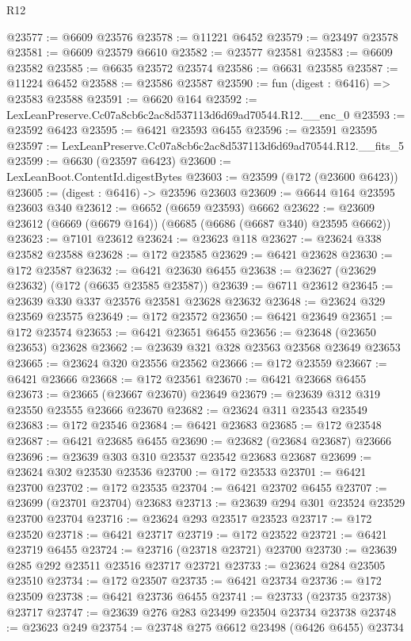 \begin{lexlean}{R12}
\begin{coremodule}
@23577 := @6609 @23576
@23578 := @11221 @6452
@23579 := @23497 @23578
@23581 := @6609 @23579 @6610
@23582 := @23577 @23581
@23583 := @6609 @23582
@23585 := @6635 @23572 @23574
@23586 := @6631 @23585
@23587 := @11224 @6452
@23588 := @23586 @23587
@23590 := fun (digest : @6416) => @23583 @23588
@23591 := @6620 @164
@23592 := LexLeanPreserve.Cc07a8cb6c2ac8d537113d6d69ad70544.R12.__enc_0
@23593 := @23592 @6423
@23595 := @6421 @23593 @6455
@23596 := @23591 @23595
@23597 := LexLeanPreserve.Cc07a8cb6c2ac8d537113d6d69ad70544.R12.__fits_5
@23599 := @6630 (@23597 @6423)
@23600 := LexLeanBoot.ContentId.digestBytes
@23603 := @23599 (@172 (@23600 @6423))
@23605 := (digest : @6416) -> @23596 @23603
@23609 := @6644 @164 @23595 @23603 @340
@23612 := @6652 (@6659 @23593) @6662
@23622 := @23609 @23612 (@6669 (@6679 @164)) (@6685 (@6686 (@6687 @340) @23595 @6662))
@23623 := @7101 @23612
@23624 := @23623 @118
@23627 := @23624 @338 @23582 @23588
@23628 := @172 @23585
@23629 := @6421 @23628
@23630 := @172 @23587
@23632 := @6421 @23630 @6455
@23638 := @23627 (@23629 @23632) (@172 (@6635 @23585 @23587))
@23639 := @6711 @23612
@23645 := @23639 @330 @337 @23576 @23581 @23628 @23632
@23648 := @23624 @329 @23569 @23575
@23649 := @172 @23572
@23650 := @6421 @23649
@23651 := @172 @23574
@23653 := @6421 @23651 @6455
@23656 := @23648 (@23650 @23653) @23628
@23662 := @23639 @321 @328 @23563 @23568 @23649 @23653
@23665 := @23624 @320 @23556 @23562
@23666 := @172 @23559
@23667 := @6421 @23666
@23668 := @172 @23561
@23670 := @6421 @23668 @6455
@23673 := @23665 (@23667 @23670) @23649
@23679 := @23639 @312 @319 @23550 @23555 @23666 @23670
@23682 := @23624 @311 @23543 @23549
@23683 := @172 @23546
@23684 := @6421 @23683
@23685 := @172 @23548
@23687 := @6421 @23685 @6455
@23690 := @23682 (@23684 @23687) @23666
@23696 := @23639 @303 @310 @23537 @23542 @23683 @23687
@23699 := @23624 @302 @23530 @23536
@23700 := @172 @23533
@23701 := @6421 @23700
@23702 := @172 @23535
@23704 := @6421 @23702 @6455
@23707 := @23699 (@23701 @23704) @23683
@23713 := @23639 @294 @301 @23524 @23529 @23700 @23704
@23716 := @23624 @293 @23517 @23523
@23717 := @172 @23520
@23718 := @6421 @23717
@23719 := @172 @23522
@23721 := @6421 @23719 @6455
@23724 := @23716 (@23718 @23721) @23700
@23730 := @23639 @285 @292 @23511 @23516 @23717 @23721
@23733 := @23624 @284 @23505 @23510
@23734 := @172 @23507
@23735 := @6421 @23734
@23736 := @172 @23509
@23738 := @6421 @23736 @6455
@23741 := @23733 (@23735 @23738) @23717
@23747 := @23639 @276 @283 @23499 @23504 @23734 @23738
@23748 := @23623 @249
@23754 := @23748 @275 @6612 @23498 (@6426 @6455) @23734

\end{coremodule}
\end{lexlean}

